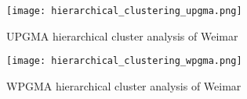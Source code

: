 
\begin{figure}
    \centering
    \begin{mdframed}[style=mdthight]
        \texttt{[image: hierarchical\_clustering\_upgma.png]}
    \end{mdframed}
    \caption{UPGMA hierarchical cluster analysis of Weimar\label{fig:hierarchical_clustering_upgma}}
\end{figure}


\begin{figure}
    \centering
    \begin{mdframed}[style=mdthight]
        \texttt{[image: hierarchical\_clustering\_wpgma.png]}
    \end{mdframed}
    \caption{WPGMA hierarchical cluster analysis of Weimar\label{fig:hierarchical_clustering_wpgma}}
\end{figure}
